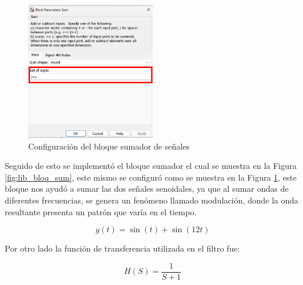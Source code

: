 \begin{figure}[h!]
    \centering
    \includegraphics[width=0.5\textwidth]{fig/especifico_2/CASO_ESTUDIO_FILTRO/sum_1.pdf}
    \caption{Configuración del bloque sumador de señales}
    \label{fig:lib_bloq_sum_conf}
\end{figure}


Seguido de esto se implementó el bloque sumador el cual se muestra en la Figura \ref{fig:lib_bloq_sum}, este mismo se configuró como se muestra en la Figura \ref{fig:lib_bloq_sum_conf}, este bloque nos ayudó a sumar las dos señales senoidales, ya que al sumar ondas de diferentes frecuencias, se genera un fenómeno llamado modulación, donde la onda resultante presenta un patrón que varía en el tiempo.

\begin{equation}
    y(t) = \sin(t) + \sin(12t)
    \label{eq:funcion_de_suma_de_ondas}
\end{equation}

Por otro lado la función de transferencia utilizada en el filtro fue:

\begin{equation}
    H(S) = \frac{1}{S+1}
    \label{eq:funcion_de_transferencia_filtro}
\end{equation}

\newpage

